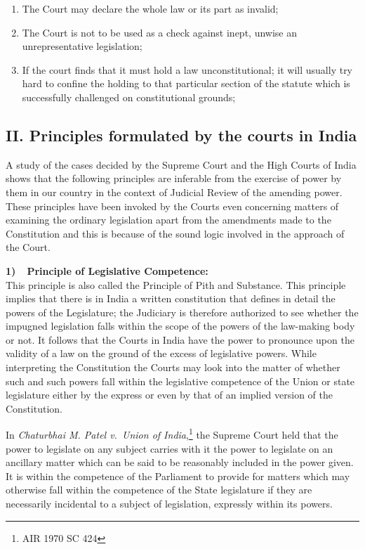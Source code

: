\begin{multicols}{2}
\begin{enumerate}
\item The Court may declare the whole law or its part as invalid;

\item The Court is not to be used as a check against inept, unwise an unrepresentative
legislation;

\item If the court finds that it must hold a law unconstitutional; it will usually try hard
to confine the holding to that particular section of the statute which is successfully
challenged on constitutional grounds;

\vspace{-.4cm}

\end{enumerate}

\vspace{-.4cm}

\subsection*{II. Principles formulated by the courts in India}

\noi
A study of the cases decided by the Supreme Court and the High Courts of India shows
that the following principles are inferable from the exercise of power by them in our
country in the context of Judicial Review of the amending power. These principles have
been invoked by the Courts even concerning matters of examining the ordinary
legislation apart from the amendments made to the Constitution and this is because of
the sound logic involved in the approach of the Court.

\noi
{\bf 1)~~Principle of Legislative Competence: }\\[.2cm] This principle is also called the Principle of Pith and Substance. This principle
implies that there is in India a written constitution that defines in detail the powers of
the Legislature; the Judiciary is therefore authorized to see whether the impugned
legislation falls within the scope of the powers of the law-making body or not. It follows
that the Courts in India have the power to pronounce upon the validity of a law on the
ground of the excess of legislative powers. While interpreting the Constitution the
Courts may look into the matter of whether such and such powers fall within the
legislative competence of the Union or state legislature either by the express or even by
that of an implied version of the Constitution. 

\noi
In \textit{Chaturbhai M. Patel v.~Union of India},\footnote{ AIR 1970 SC 424}
the Supreme Court held that the power to
legislate on any subject carries with it the power to legislate on an ancillary matter
which can be said to be reasonably included in the power given. It is within the
competence of the Parliament to provide for matters which may otherwise fall within the competence of the State legislature if they are necessarily incidental to a subject of
legislation, expressly within its powers.


\end{multicols}
